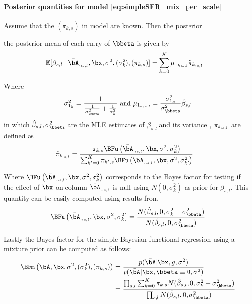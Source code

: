 \paragraph{Posterior quantities for model \ref{eq:simpleSFR_mix_per_scale}}
Assume that the $(\pi_{k ,s})$ in model are known. Then 
the posterior 

the posterior mean  of each entry of $ \bbeta$ is given by
\begin{align}
     \mathbb{E}[\beta_{s,l}\mid\bar{\bA}_{.,_{s,l}},\bx,\sigma^2,(\sigma^2_k),(\pi_{k,s})]&
      = \sum_{k=0}^K \mu_{1_k,_{s,l}} \Tilde{\pi}_{k, _{s,l}}
\end{align}

Where
\begin{align}
     \sigma_{1_k }^2    = \frac{1}{\frac{1}{\sigma_{\bbeta }^2}+\frac{1}{\sigma_{k}^2}}  \text{ and } 
     \mu_{1_k,_{s,l}}    =  \frac{ \sigma_{1_k}^2}{\sigma_{\bbeta }^2}\hat{\beta} _{s,l}  \label{eq:post_mean_simple_prior}
\end{align}
in which $\hat{\beta}_{s,l},\sigma_{\bbeta }^2$ are the MLE  estimates of $\beta_{s,l }$ and its variance ,  $ \Tilde{\pi}_{k, _{s,l}}$ are defined as
\begin{align}
   \Tilde{\pi}_{k, _{s,l}}    & = \frac{\pi_{k,s} \BFu\left(\bar{\bA}_{.,_{s,l}},\bx, \sigma^2, \sigma_k^2 \right)}{ \sum_{k'=0}^K \pi_{k',s} \BFu\left(\bar{\bA}_{.,_{s,l}},\bx, \sigma^2 ,\sigma_{k'}^2 \right)}
\end{align}

Where  $\BFu\left(\bar{\bA}_{.,_{s,l}},\bx, \sigma^2, \sigma_{k }^2 \right)$ corresponds to the Bayes factor for testing if the effect of $\bx$  on column  $\bar{\bA}_{.,_{s,l}}$ is null using $N(0, \sigma_{k }^2)$ as prior for $\beta_{s,l}$. This quantity can be easily computed using results from \cite{wakefield_bayes_2009}   
\begin{align}\label{eq:simpleBayeregBF}
    \BFu\left(\bar{\bA}_{.,_{s,l}},\bx, \sigma^2, \sigma_{k }^2 \right)= \frac{  N(\hat{\beta} _{s,l},0,\sigma_k^2+\sigma_{ \bbeta}^2)}{  N(\hat{\beta} _{s,l},0,\sigma_{ \bbeta}^2)}
\end{align}


 
Lastly the  Bayes factor for the simple Bayesian functional regression using a mixture prior can be computed as follows:
\begin{align}\label{eq:BFmix}
    \BFm\left(\bar{\bA} ,\bx, \sigma^2 ,(\sigma^2_k) , (\pi_{k,s})    \right)&=\frac{p(\bar{\bA}|\bx, g, \sigma^2)}{p(\bar{\bA}|\bx,  \bbeta\equiv 0,\sigma^2)}\\
          &= \frac{  \prod_{s,l} \sum_{k=0}^K  \pi_{k,s} N(\hat{\beta} _{s,l},0,\sigma_k^2+\sigma_{ \bbeta}^2)}{\prod_{s,l} N(\hat{\beta} _{s,l},0,\sigma_{ \bbeta}^2)}
\end{align}



